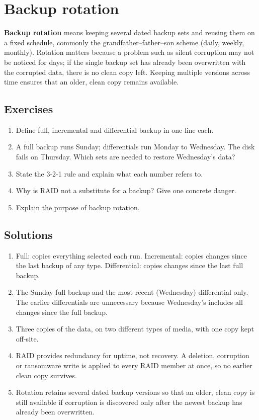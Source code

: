 \section{Backup rotation}
\textbf{Backup rotation} means keeping several dated backup sets and reusing
them on a fixed schedule, commonly the grandfather--father--son scheme (daily,
weekly, monthly). Rotation matters because a problem such as silent
corruption may not be noticed for days; if the single backup set has already
been overwritten with the corrupted data, there is no clean copy left.
Keeping multiple versions across time ensures that an older, clean copy
remains available.

\subsection*{Exercises}
\begin{enumerate}[label=\arabic*.]
  \item Define full, incremental and differential backup in one line each.
  \item A full backup runs Sunday; differentials run Monday to Wednesday. The
    disk fails on Thursday. Which sets are needed to restore Wednesday's
    data?
  \item State the 3-2-1 rule and explain what each number refers to.
  \item Why is RAID not a substitute for a backup? Give one concrete danger.
  \item Explain the purpose of backup rotation.
\end{enumerate}

\subsection*{Solutions}
\begingroup\small
\begin{enumerate}[label=\arabic*.]
  \item Full: copies everything selected each run. Incremental: copies changes
    since the last backup of any type. Differential: copies changes since the
    last full backup.
  \item The Sunday full backup and the most recent (Wednesday) differential
    only. The earlier differentials are unnecessary because Wednesday's
    includes all changes since the full backup.
  \item Three copies of the data, on two different types of media, with one
    copy kept off-site.
  \item RAID provides redundancy for uptime, not recovery. A deletion,
    corruption or ransomware write is applied to every RAID member at once,
    so no earlier clean copy survives.
  \item Rotation retains several dated backup versions so that an older, clean
    copy is still available if corruption is discovered only after the newest
    backup has already been overwritten.
\end{enumerate}
\endgroup

